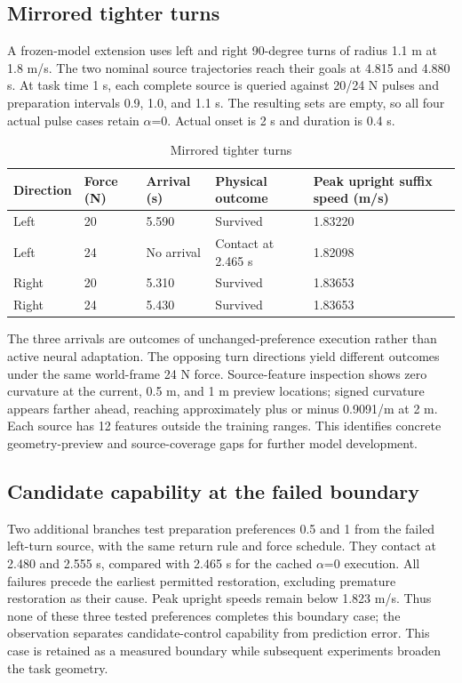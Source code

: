 \documentclass[journal]{IEEEtran}
\begin{document}
\subsection{Mirrored tighter turns}

A frozen-model extension uses left and right 90-degree turns of radius 1.1 m at 1.8 m/s. The two nominal source trajectories reach their goals at 4.815 and 4.880 s. At task time 1 s, each complete source is queried against 20/24 N pulses and preparation intervals 0.9, 1.0, and 1.1 s. The resulting sets are empty, so all four actual pulse cases retain $\alpha$=0. Actual onset is 2 s and duration is 0.4 s.



\begin{table}[tp]
\caption{Mirrored tighter turns}
\centering
\begin{tabular}{p{}p{}p{}p{}p{}}
\hline
Direction & Force (N) & Arrival (s) & Physical outcome & Peak upright suffix speed (m/s) \\
\hline
Left & 20 & 5.590 & Survived & 1.83220 \\
\hline
Left & 24 & No arrival & Contact at 2.465 s & 1.82098 \\
\hline
Right & 20 & 5.310 & Survived & 1.83653 \\
\hline
Right & 24 & 5.430 & Survived & 1.83653 \\
\hline
\end{tabular}
\end{table}
The three arrivals are outcomes of unchanged-preference execution rather than active neural adaptation. The opposing turn directions yield different outcomes under the same world-frame 24 N force. Source-feature inspection shows zero curvature at the current, 0.5 m, and 1 m preview locations; signed curvature appears farther ahead, reaching approximately plus or minus 0.9091/m at 2 m. Each source has 12 features outside the training ranges. This identifies concrete geometry-preview and source-coverage gaps for further model development.


\subsection{Candidate capability at the failed boundary}

Two additional branches test preparation preferences 0.5 and 1 from the failed left-turn source, with the same return rule and force schedule. They contact at 2.480 and 2.555 s, compared with 2.465 s for the cached $\alpha$=0 execution. All failures precede the earliest permitted restoration, excluding premature restoration as their cause. Peak upright speeds remain below 1.823 m/s. Thus none of these three tested preferences completes this boundary case; the observation separates candidate-control capability from prediction error. This case is retained as a measured boundary while subsequent experiments broaden the task geometry.
\end{document}
